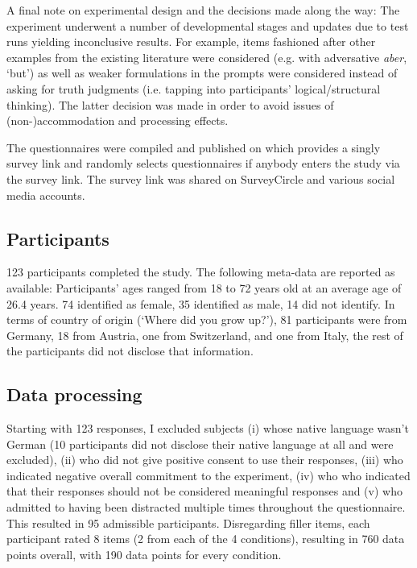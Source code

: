 \documentclass[output=paper,
modfonts
]{langscibook}
\begin{document}
A final note on experimental design and the decisions made along the way: The experiment underwent a number of developmental stages and updates due to test runs yielding inconclusive results. For example, items fashioned after other examples from the existing literature were considered (e.g.  with adversative \textit{aber}, `but') as well as weaker formulations in the prompts were considered instead of asking for truth judgments (i.e. tapping into participants' logical/structural thinking). The latter decision was made in order to avoid issues of \linebreak(non-)accommodation and processing effects.

The questionnaires were compiled and published on \citet{sosci_website} which provides a singly survey link and randomly selects questionnaires if anybody enters the study via the survey link. The survey link was shared on SurveyCircle \citep{survey_circle_website} and various social media accounts. 

\subsection{Participants}

123 participants completed the study. The following meta-data are reported as available: Participants' ages ranged from 18 to 72 years old at an average age of 26.4 years. 74 identified as female, 35 identified as male, 14 did not identify. In terms of country of origin (`Where did you grow up?'), 81 participants were from Germany, 18 from Austria, one from Switzerland, and one from Italy, the rest of the participants did not disclose that information.

\subsection{Data processing}

Starting with 123 responses, I excluded subjects (i) whose native language wasn't German (10 participants did not disclose their native language at all and were excluded), (ii) who did not give positive consent to use their responses, (iii) who indicated negative overall commitment to the experiment, (iv) who who indicated that their responses should not be considered meaningful responses and (v) who admitted to having been distracted multiple times throughout the questionnaire. This resulted in 95 admissible participants. Disregarding filler items, each participant rated 8 items (2 from each of the 4 conditions), resulting in 760 data points overall, with 190 data points for every condition.
\end{document}
